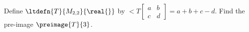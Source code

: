 Define $\ltdefn{T}{M_{2,2}}{\real{\null}}$ by 
$\lt{T}{\begin{bmatrix} a & b \\ c & d \end{bmatrix}} = a + b + c - d$.  
Find the pre-image $\preimage{T}{3}$.
